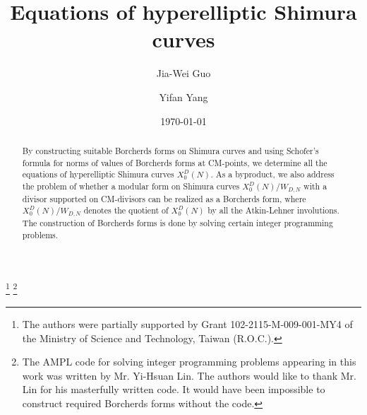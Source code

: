 \documentclass{amsart}
\theoremstyle{definition}
\begin{document}
\title{Equations of hyperelliptic Shimura curves}

\author{Jia-Wei Guo}
\address{Department of Mathematics, National Tsing Hua University,
  Hsinchu, Taiwan 300}


\author{Yifan Yang}
\address{Department of Applied Mathematics, National Chiao Tung
  University, Hsinchu, Taiwan 300}  
\date{\today}
\thanks{The authors were partially supported by Grant
  102-2115-M-009-001-MY4 of the Ministry of Science and Technology,
  Taiwan (R.O.C.).}
\thanks{
  The AMPL code for solving integer programming problems appearing in
  this work was written by Mr. Yi-Hsuan Lin. The authors would like to
  thank Mr. Lin for his masterfully written code. It would have been
  impossible to construct required Borcherds forms without the code.} 

\begin{abstract}
By constructing suitable Borcherds forms on Shimura curves and using
Schofer's formula for norms of values of Borcherds forms at CM-points, we
determine all the equations of hyperelliptic Shimura curves
$X_0^D(N)$. As a byproduct, we also address the problem of whether a
modular form on Shimura curves $X_0^D(N)/W_{D,N}$ with a divisor
supported on CM-divisors can be realized as a Borcherds form, where
$X_0^D(N)/W_{D,N}$ denotes the quotient of $X_0^D(N)$ by all the
Atkin-Lehner involutions.
 The construction of Borcherds forms is done by solving
certain integer programming problems.
\end{abstract}
\maketitle
\end{document}
